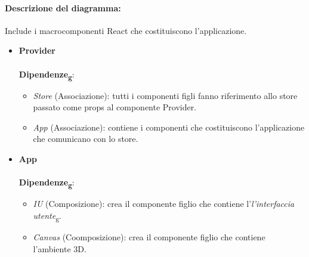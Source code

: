 \paragraph*{Descrizione del diagramma:}
Include i macrocomponenti React che costituiscono l'applicazione.
\begin{itemize}
		\item \textbf{Provider}
		\\\\
		\textbf{Dipendenze\textsubscript{g}}:
		\begin{itemize}
			\item \textit{Store} (Associazione): tutti i componenti figli fanno riferimento allo store passato come props al 
			componente Provider.
			\item \textit{App} (Associazione): contiene i componenti che costituiscono l'applicazione che comunicano con lo store.
		\end{itemize}

		\item \textbf{App}
		\\\\
		\textbf{Dipendenze\textsubscript{g}}:
		\begin{itemize}
			\item \textit{IU} (Composizione): crea il componente figlio che contiene l'\textit{l'interfaccia 
		utente}\textsubscript{g}.
			\item \textit{Canvas} (Coomposizione): crea il componente figlio che contiene l'ambiente 3D.
		\end{itemize}
\end{itemize}

